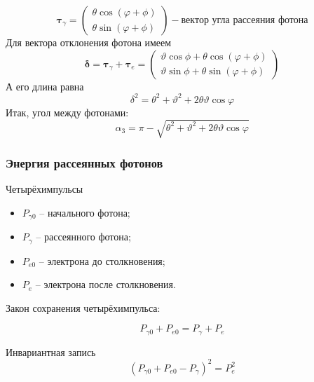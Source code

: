 \documentclass[12pt,a4paper]{article}
\begin{document}
\begin{equation}
    \bm{\tau}_{\gamma} = 
    \begin{pmatrix}
        \theta \cos (\varphi + \phi) \\
        \theta \sin (\varphi + \phi)
    \end{pmatrix} - \text{вектор угла рассеяния фотона}
\end{equation}
Для вектора отклонения фотона имеем
\begin{equation}
    \bm{\delta} =  \bm{\tau}_{\gamma} + \bm{\tau}_e = 
    \begin{pmatrix}
         \vartheta \cos \phi +  \theta \cos (\varphi + \phi) \\
         \vartheta \sin \phi +  \theta \sin (\varphi + \phi)
    \end{pmatrix}
\end{equation}
А его длина равна
\begin{equation}
    \delta^2 = \theta^2 + \vartheta^2 + 2\theta\vartheta\cos\varphi
\end{equation}
Итак, угол между фотонами:
\begin{equation}
    \alpha_3 = \pi - \sqrt{\theta^2 + \vartheta^2 + 2\theta\vartheta\cos\varphi}
\end{equation}


\subsubsection{Энергия рассеянных фотонов}
Четырёхимпульсы
\begin{itemize}
\item $P_{\gamma0} $ -- начального фотона;
\item $P_{\gamma} $ -- рассеянного фотона;
\item $P_{e0} $ -- электрона до столкновения;
\item $P_{e} $ -- электрона после столкновения.
\end{itemize}




\bigskip
Закон сохранения четырёхимпульса:

\begin{equation}
    P_{\gamma0} + P_{e0} = P_{\gamma} + P_{e}
\end{equation}

Инвариантная запись 
\begin{equation}
    (P_{\gamma0} + P_{e0} - P_{\gamma})^2  = P^2_{e}
\end{equation}
\end{document}
